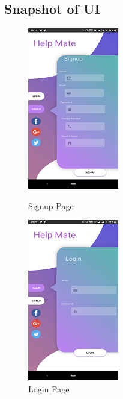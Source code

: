 \documentclass{article}
\begin{document}
\begin{flushleft}
        \subsection{Snapshot of UI}
      \begin{figure}[!h]
	\centering
	\begin{minipage}[t]{4cm}
		\centering
		\includegraphics[scale=1]{Signup.png}
		\caption{Signup Page}
	\end{minipage}
	\hspace{3cm}
	\begin{minipage}[t]{4cm}
		\centering
		\includegraphics[scale=1]{Login.png}
		\caption{Login Page}
	\end{minipage}
 

\end{figure}
\end{flushleft}
\end{document}

